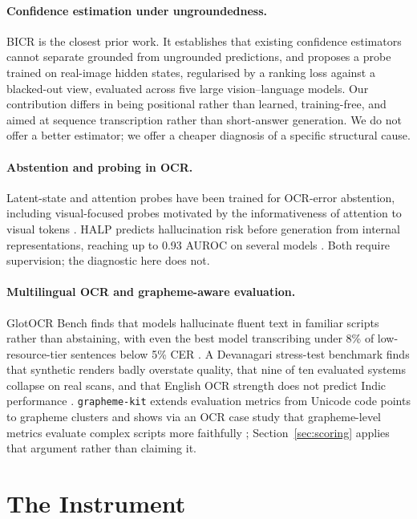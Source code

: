 \documentclass{article}
\begin{document}
\paragraph{Confidence estimation under ungroundedness.} BICR \citep{khanmohammadi2026bicr} is
the closest prior work. It establishes that existing confidence estimators cannot separate
grounded from ungrounded predictions, and proposes a probe trained on real-image hidden
states, regularised by a ranking loss against a blacked-out view, evaluated across five large
vision--language models. Our contribution differs in being positional rather than learned,
training-free, and aimed at sequence transcription rather than short-answer generation. We do
not offer a better estimator; we offer a cheaper diagnosis of a specific structural cause.

\paragraph{Abstention and probing in OCR.} Latent-state and attention probes have been trained
for OCR-error abstention, including visual-focused probes motivated by the informativeness of
attention to visual tokens \citep{readingbetweenlines2025}. HALP predicts hallucination risk
before generation from internal representations, reaching up to 0.93 AUROC on several models
\citep{kogilathota2026halp}. Both require supervision; the diagnostic here does not.

\paragraph{Multilingual OCR and grapheme-aware evaluation.} GlotOCR Bench finds that models
hallucinate fluent text in familiar scripts rather than abstaining, with even the best model
transcribing under 8\% of low-resource-tier sentences below 5\% CER
\citep{kargaran2026glotocr}. A Devanagari stress-test benchmark finds that synthetic renders
badly overstate quality, that nine of ten evaluated systems collapse on real scans, and that
English OCR strength does not predict Indic performance \citep{devanagari2026stresstest}.
\texttt{grapheme-kit} extends evaluation metrics from Unicode code points to grapheme clusters
and shows via an OCR case study that grapheme-level metrics evaluate complex scripts more
faithfully \citep{nisfer2026graphemekit}; Section~\ref{sec:scoring} applies that argument
rather than claiming it.

\section{The Instrument}
\end{document}
